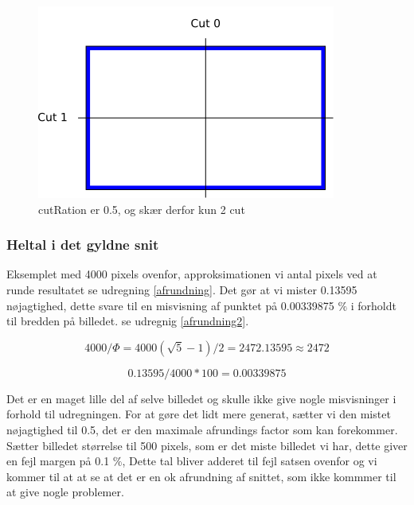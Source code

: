 \begin{figure}[h]
	\begin{center}
		\includegraphics[scale=0.42,angle=0]{afsnit/vores_implementation/billeder/naiv_algoritme/2Cut}
	\end{center}
	\caption[]{cutRation er 0.5, og skær derfor kun 2 cut}
	\label{2Cut}
\end{figure}

\subsubsection*{Heltal i det gyldne snit}



Eksemplet med 4000 pixels ovenfor, approksimationen vi antal pixels ved at
runde resultatet se udregning \ref{afrundning}. Det gør at vi mister 0.13595 nøjagtighed, dette svare
til en misvisning af punktet på 0.00339875 $\%$ i forholdt til bredden på
billedet. se udregnig \ref{afrundning2}. 

\begin{equation}
	4000/\varPhi = 4000(\sqrt{5}-1)/2 = 2472.13595 \approx 2472 \label{afrundning}
\end{equation}

\begin{equation}
	0.13595/4000*100 = 0.00339875 \label{afrundning2}
\end{equation}

Det er en maget lille del af selve billedet og skulle ikke give nogle
misvisninger i forhold til udregningen. For at gøre det lidt mere
generat, sætter vi den mistet nøjagtighed til 0.5, det er den maximale
afrundings factor som kan forekommer. Sætter billedet størrelse til 500
pixels, som er det miste billedet vi har, dette giver en fejl margen på
0.1 $\%$, Dette tal bliver adderet til fejl satsen ovenfor og vi kommer
til at at se at det er en ok afrundning af snittet, som ikke kommmer til
at give nogle problemer. 

